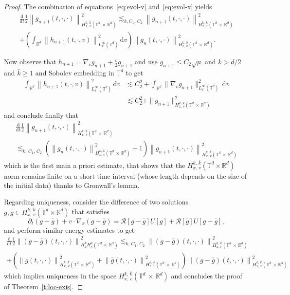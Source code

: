 \documentclass[10pt]{amsart}
\theoremstyle{definition}\newtheorem{defi}[theo]{Definition}\newtheorem{rema}[theo]{Remark}\newtheorem{exam}[theo]{Example}\newtheorem{exem}[theo]{Example}\newtheorem{nota}[theo]{Notation}
\newcommand{\R}{\mathbb{R}}
\newcommand{\T}{\mathbb{T}}
\newcommand*\fR{\mathcal{R}}
\newcommand\dt{{\frac{\mathrm d}{\mathrm dt}}}
\newcommand{\dd}{{\, \mathrm d}}
\begin{document}
\begin{proof}
The combination of equations~\eqref{eq:evol-v} and~\eqref{eq:evol-x} yields
\begin{multline}\label{eq:evol-global}
\dt \frac12 \left\| g_{n+1}(t,\cdot,\cdot)\right\|_{H^{k,\,\bar k}_{x,\,v}\left(\T^d\,\times\,\R^d\right)}^2 \lesssim_{k,C_1,\,C_2}
\left\| g_{n+1} (t,\cdot,\cdot) \right\|_{H^{\bar k,\,\bar k}_{x,v}\left(\T^d\,\times\,\R^d\right)}^2 \\
+ \left(\int_{\R^d} \left\| h_{n+1}(t,\cdot,v)
\right\|_{L^\infty_x(\T^d)}^2 \dd v \right) \left\| g_n(t,\cdot,\cdot) \right\|_{H^{k,\,0}_{x,\,v}\left(\T^d\,\times
\,\R^d\right)}^2.
\end{multline}

Now observe that $h_{n+1} = \nabla_v g_{n+1} + \frac{v}{2} g_{n+1}$ and use $g_{n+1} \le C_2 \sqrt\mu$ and $k>d/2$ and ${\bar k} \ge 1$ and Sobolev embedding in $\T^d$ to get
\begin{align*}
\int_{\R^d} \left\| h_{n+1}(t,\cdot,v) \right\|_{L^\infty_x(\T^d)} ^2 \dd v & \lesssim C_2^2+ \int_{\R^d} \| \nabla_v g_{n+1} \|_{L^\infty_x(\T^d)} ^2 \dd v \\
& \lesssim C_2^2 + \| g_{n+1} \|_{H^{k,\,\bar k}_{x,\,v} \left(\T^d\,\times\,\R^d\right)}^2
\end{align*}
and conclude finally that
\begin{multline}\label{eq:gronwall}
\dt \frac12 \left\| g_{n+1}(t,\cdot,\cdot)\right\|_{H^{k,\,\bar k}_{x,\,v}\left(\T^d\,\times\,\R^d\right)}^2 \\
\lesssim_{k,\,C_1,\,C_2}
\left(\left\| g_n(t,\cdot,\cdot) \right\|_{H^{k,\,\bar k}_{x,\,v}\left(\T^d\,\times\,\R^d\right)}^2 + 1 \right)
\left\| g_{n+1}(t,\cdot,\cdot) \right\|_{H^{k,\,\bar k}_{x,\,v}\left(\T^d\,\times\,\R^d\right)}^2
\end{multline}
which is the first main a priori estimate, that shows that the $H^{k,\,\bar k}_{x,\,v}(\T^d\times \R^d)$ norm remains finite on a short time interval (whose length depends on the size of the initial data) thanks to Gronwall's lemma.

Regarding uniqueness, consider the difference of two solutions $g,{\bar g} \in H^{k,\,\bar k}_{x,\,v}(\T^d \times \R^d)$ that satisfies
\[
\partial_t(g-{\bar g}) + v \cdot \nabla_x (g-{\bar g}) =
\fR[g-{\bar g}]U[g]+ \fR[{\bar g}] U[g-{\bar g}],
\]
and perform similar energy estimates to get
\begin{multline}\label{eq:difference}
\dt \frac12 \left\| (g-{\bar g})(t,\cdot,\cdot)
\right\|_{H^k_{x}H^{\bar k}_v\left(\T^d\,\times\,\R^d\right)}^2
\lesssim_{k,\,C_1,\,C_2} \left\| (g-{\bar g})(t,\cdot,\cdot)\right\|_{H^{k,\,\bar k}_{x,v}\left(\T^d\,\times \,\R^d\right)}^2 \\
+ \left(\left\| g(t,\cdot,\cdot)
\right\|_{H^{k,\,\bar k}_{x,\,v}\left(\T^d\,\times\,\R^d\right)}^2 + \left\| {\bar g}(t,\cdot,\cdot)
\right\|_{H^{k,\,\bar k}_{x,\,v}\left(\T^d\,\times\,\R^d\right)} ^2 \right)
\left\| (g-{\bar g})(t,\cdot,\cdot)
\right\|_{H^{k,\,\bar k}_{x,\,v}\left(\T^d\,\times\,\R^d\right)}^2
\end{multline}
which implies uniqueness in the space $H^{k,\,\bar k}_{x,\,v}(\T^d\,\times\,\R^d)$ and concludes the proof of Theorem~\ref{t:loc-exis}.
\end{proof}
\end{document}
